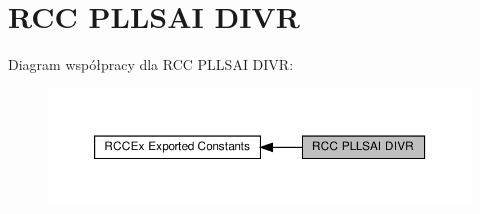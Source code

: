 \hypertarget{group___r_c_c_ex___p_l_l_s_a_i___d_i_v_r}{}\section{R\+CC P\+L\+L\+S\+AI D\+I\+VR}
\label{group___r_c_c_ex___p_l_l_s_a_i___d_i_v_r}
Diagram współpracy dla R\+CC P\+L\+L\+S\+AI D\+I\+VR\+:\nopagebreak
\begin{figure}[H]
\begin{center}
\leavevmode
\includegraphics[width=350pt]{group___r_c_c_ex___p_l_l_s_a_i___d_i_v_r}
\end{center}
\end{figure}
